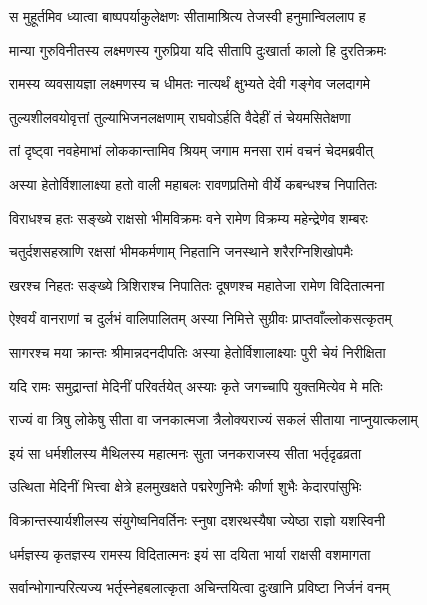\twolineshloka
{स मुहूर्तमिव ध्यात्वा बाष्पपर्याकुलेक्षणः}
{सीतामाश्रित्य तेजस्वी हनुमान्विललाप ह} %

\twolineshloka
{मान्या गुरुविनीतस्य लक्ष्मणस्य गुरुप्रिया}
{यदि सीतापि दुःखार्ता कालो हि दुरतिक्रमः} %

\twolineshloka
{रामस्य व्यवसायज्ञा लक्ष्मणस्य च धीमतः}
{नात्यर्थं क्षुभ्यते देवी गङ्गेव जलदागमे} %

\twolineshloka
{तुल्यशीलवयोवृत्तां तुल्याभिजनलक्षणाम्}
{राघवोऽर्हति वैदेहीं तं चेयमसितेक्षणा} %

\twolineshloka
{तां दृष्ट्वा नवहेमाभां लोककान्तामिव श्रियम्}
{जगाम मनसा रामं वचनं चेदमब्रवीत्} %

\twolineshloka
{अस्या हेतोर्विशालाक्ष्या हतो वाली महाबलः}
{रावणप्रतिमो वीर्ये कबन्धश्च निपातितः} %

\twolineshloka
{विराधश्च हतः सङ्ख्ये राक्षसो भीमविक्रमः}
{वने रामेण विक्रम्य महेन्द्रेणेव शम्बरः} %

\twolineshloka
{चतुर्दशसहस्राणि रक्षसां भीमकर्मणाम्}
{निहतानि जनस्थाने शरैरग्निशिखोपमैः} %

\twolineshloka
{खरश्च निहतः सङ्ख्ये त्रिशिराश्च निपातितः}
{दूषणश्च महातेजा रामेण विदितात्मना} %

\twolineshloka
{ऐश्वर्यं वानराणां च दुर्लभं वालिपालितम्}
{अस्या निमित्ते सुग्रीवः प्राप्तवाँल्लोकसत्कृतम्} %

\twolineshloka
{सागरश्च मया क्रान्तः श्रीमान्नदनदीपतिः}
{अस्या हेतोर्विशालाक्ष्याः पुरी चेयं निरीक्षिता} %

\twolineshloka
{यदि रामः समुद्रान्तां मेदिनीं परिवर्तयेत्}
{अस्याः कृते जगच्चापि युक्तमित्येव मे मतिः} %

\twolineshloka
{राज्यं वा त्रिषु लोकेषु सीता वा जनकात्मजा}
{त्रैलोक्यराज्यं सकलं सीताया नाप्नुयात्कलाम्} %

\twolineshloka
{इयं सा धर्मशीलस्य मैथिलस्य महात्मनः}
{सुता जनकराजस्य सीता भर्तृदृढव्रता} %

\twolineshloka
{उत्थिता मेदिनीं भित्त्वा क्षेत्रे हलमुखक्षते}
{पद्मरेणुनिभैः कीर्णा शुभैः केदारपांसुभिः} %

\twolineshloka
{विक्रान्तस्यार्यशीलस्य संयुगेष्वनिवर्तिनः}
{स्नुषा दशरथस्यैषा ज्येष्ठा राज्ञो यशस्विनी} %

\twolineshloka
{धर्मज्ञस्य कृतज्ञस्य रामस्य विदितात्मनः}
{इयं सा दयिता भार्या राक्षसी वशमागता} %

\twolineshloka
{सर्वान्भोगान्परित्यज्य भर्तृस्नेहबलात्कृता}
{अचिन्तयित्वा दुःखानि प्रविष्टा निर्जनं वनम्} %


